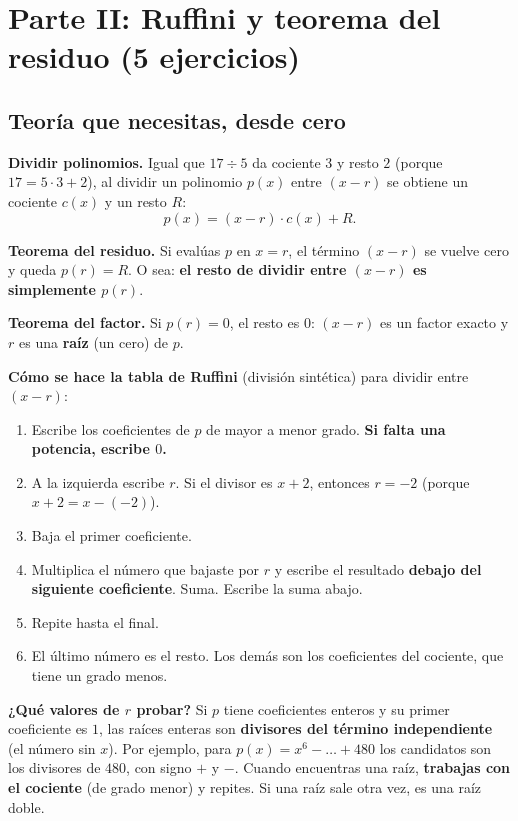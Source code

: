 \documentclass[11pt,a4paper]{article}
\begin{document}
\newpage
\section{Parte II: Ruffini y teorema del residuo (5 ejercicios)}

\subsection{Teoría que necesitas, desde cero}

\begin{idea}
\textbf{Dividir polinomios.} Igual que $17\div5$ da cociente $3$ y resto $2$ (porque $17=5\cdot3+2$), al dividir un polinomio $p(x)$ entre $(x-r)$ se obtiene un cociente $c(x)$ y un resto $R$:
\[ p(x)=(x-r)\cdot c(x)+R. \]

\textbf{Teorema del residuo.} Si evalúas $p$ en $x=r$, el término $(x-r)$ se vuelve cero y queda $p(r)=R$.
O sea: \textbf{el resto de dividir entre $(x-r)$ es simplemente $p(r)$}.

\textbf{Teorema del factor.} Si $p(r)=0$, el resto es $0$: $(x-r)$ es un factor exacto y $r$ es una \textbf{raíz} (un cero) de $p$.
\end{idea}

\begin{idea}
\textbf{Cómo se hace la tabla de Ruffini} (división sintética) para dividir entre $(x-r)$:
\begin{enumerate}[nosep]
  \item Escribe los coeficientes de $p$ de mayor a menor grado. \textbf{Si falta una potencia, escribe $0$.}
  \item A la izquierda escribe $r$. Si el divisor es $x+2$, entonces $r=-2$ (porque $x+2=x-(-2)$).
  \item Baja el primer coeficiente.
  \item Multiplica el número que bajaste por $r$ y escribe el resultado \textbf{debajo del siguiente coeficiente}. Suma. Escribe la suma abajo.
  \item Repite hasta el final.
  \item El último número es el resto. Los demás son los coeficientes del cociente, que tiene un grado menos.
\end{enumerate}
\end{idea}

\begin{idea}
\textbf{¿Qué valores de $r$ probar?} Si $p$ tiene coeficientes enteros y su primer coeficiente es $1$, las raíces enteras son \textbf{divisores del término independiente} (el número sin $x$).
Por ejemplo, para $p(x)=x^6-\dots+480$ los candidatos son los divisores de $480$, con signo $+$ y $-$.
Cuando encuentras una raíz, \textbf{trabajas con el cociente} (de grado menor) y repites.
Si una raíz sale otra vez, es una raíz doble.
\end{idea}
\end{document}
